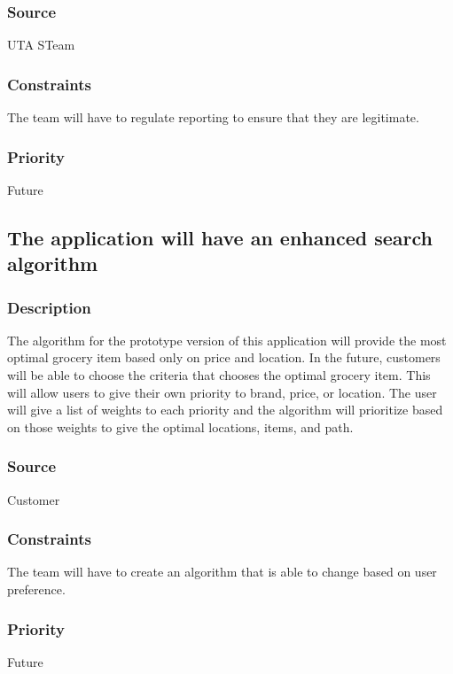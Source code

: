 \subsubsection{Source}
UTA STeam
\subsubsection{Constraints}
The team will have to regulate reporting to ensure that they are legitimate.
\subsubsection{Priority}
Future

\subsection{The application will have an enhanced search algorithm}
\subsubsection{Description}
The algorithm for the prototype version of this application  will provide the most optimal grocery item based only on price and location. In the future, customers will be able to choose the criteria that chooses the optimal grocery item. This will allow users to give their own priority to brand, price, or location. The user will give a list of weights to each priority and the algorithm will prioritize based on those weights to give the optimal locations, items, and path.
\subsubsection{Source}
Customer
\subsubsection{Constraints}
The team will have to create an algorithm that is able to change based on user preference.
\subsubsection{Priority}
Future
